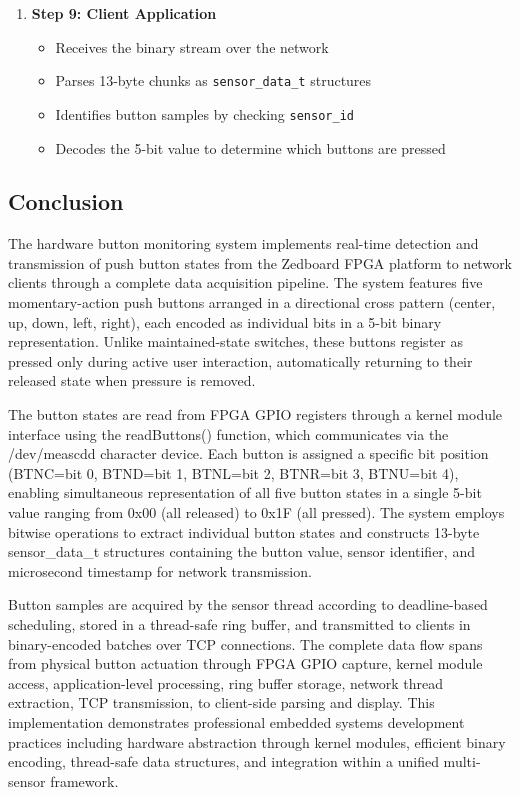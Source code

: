 \begin{enumerate}
    \item \textbf{Step 9: Client Application}
    \begin{itemize}
        \item Receives the binary stream over the network
        \item Parses 13-byte chunks as \texttt{sensor\_data\_t} structures
        \item Identifies button samples by checking \texttt{sensor\_id}
        \item Decodes the 5-bit value to determine which buttons are pressed
    \end{itemize}

\end{enumerate}


\subsection{Conclusion}
The hardware button monitoring system implements real-time detection and transmission of push button states from the Zedboard FPGA platform to network clients through a complete data acquisition pipeline. The system features five momentary-action push buttons arranged in a directional cross pattern (center, up, down, left, right), each encoded as individual bits in a 5-bit binary representation. Unlike maintained-state switches, these buttons register as pressed only during active user interaction, automatically returning to their released state when pressure is removed.

The button states are read from FPGA GPIO registers through a kernel module interface using the readButtons() function, which communicates via the /dev/meascdd character device. Each button is assigned a specific bit position (BTNC=bit 0, BTND=bit 1, BTNL=bit 2, BTNR=bit 3, BTNU=bit 4), enabling simultaneous representation of all five button states in a single 5-bit value ranging from 0x00 (all released) to 0x1F (all pressed). The system employs bitwise operations to extract individual button states and constructs 13-byte sensor\_data\_t structures containing the button value, sensor identifier, and microsecond timestamp for network transmission.

Button samples are acquired by the sensor thread according to deadline-based scheduling, stored in a thread-safe ring buffer, and transmitted to clients in binary-encoded batches over TCP connections. The complete data flow spans from physical button actuation through FPGA GPIO capture, kernel module access, application-level processing, ring buffer storage, network thread extraction, TCP transmission, to client-side parsing and display. This implementation demonstrates professional embedded systems development practices including hardware abstraction through kernel modules, efficient binary encoding, thread-safe data structures, and integration within a unified multi-sensor framework.

